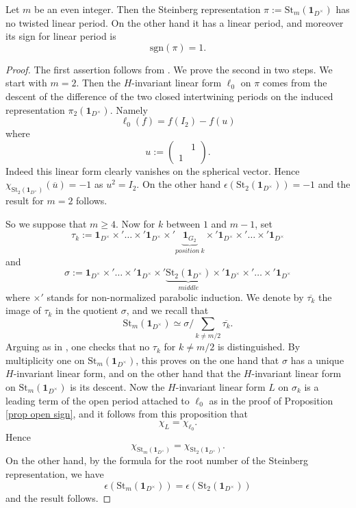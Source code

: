 \documentclass[11pt,letterpaper]{amsart}
\newcommand{\triv}{{\mathbf{1}}}
\def\e{\epsilon}
\def\St{\mathrm{St}}
\theoremstyle{plain}
\numberwithin{equation}{section}
\newcommand{\sg}{\mathrm{sgn}}
\begin{document}
\begin{prop}\label{thm st}
Let $m$ be an even integer. Then the Steinberg representation $\pi:=\St_m(\triv_{D^\times})$ has no twisted linear period. On the other hand it has a linear period, and moreover its sign for linear period is 
\[\sg(\pi)=1.\]
\end{prop}
\begin{proof}
The first assertion follows from \cite[Theorem 0.1]{Ch}. We prove the second in two steps. We start with $m=2$. Then the $H$-invariant linear form $\ell_0$ on $\pi$ comes from the descent of the difference of the two closed intertwining periods on the induced representation $\pi_2(\triv_{D^\times})$. Namely 
\[\ell_0(f)=f(I_2)-f(u)\] where \[u:=\begin{pmatrix} & 1 \\ 1 & \end{pmatrix}.\] Indeed this linear form clearly vanishes on the spherical vector. Hence $\chi_{\St_2(\triv_{D^\times})}(\overline{u})=-1$ as $u^2=I_2$. On the other hand 
$\e(\St_2(\triv_{D^\times}))=-1$ and the result for $m=2$ follows. 

So we suppose that $m\geq 4$. Now for $k$ between $1$ and $m-1$, set 
\[\tau_k:=\triv_{D^\times}\times'\dots\times' \triv_{D^\times}\times'\underbrace{\triv_{G_2}}_{position \ k} \times' \triv_{D^\times}\times' \dots  \times' \triv_{D^\times}\] and 
\[\sigma :=\triv_{D^\times}\times'\dots\times' \triv_{D^\times}\times'\underbrace{\St_2(\triv_{D^\times})}_{middle} \times' \triv_{D^\times}\times' \dots  \times' \triv_{D^\times}\] where $\times'$ stands for non-normalized parabolic induction. We denote by 
$\overline{\tau_k}$ the image of $\tau_k$ in the quotient $\sigma$, and we recall that \[\St_m(\triv_{D^\times})\simeq 
\sigma /\sum_{k\neq m/2} \overline{\tau_k}.\] Arguing as in \cite[Lemma 10.12]{MatJFA}, one checks that 
no $\tau_k$ for $k\neq m/2$ is distinguished. By multiplicity one on $\St_m(\triv_{D^\times})$, this proves on the one hand that $\sigma$ has a unique $H$-invariant linear form, and on the other hand that the $H$-invariant linear form on 
$\St_m(\triv_{D^\times})$ is its descent. Now the $H$-invariant linear form $L$ on $\sigma_k$ is a leading term of the open period attached to $\ell_0$ as in the proof of Proposition \ref{prop open sign}, and it follows from this proposition that 
\[\chi_L=\chi_{\ell_0}.\] 
Hence \[\chi_{\St_m(\triv_{D^\times})}=\chi_{\St_2(\triv_{D^\times})}.\] 
On the other hand, by the formula for the root number of the Steinberg representation, we have 
\[\e(\St_m(\triv_{D^\times}))=\e(\St_2(\triv_{D^\times}))\] and the result follows.
\end{proof}
\end{document}
